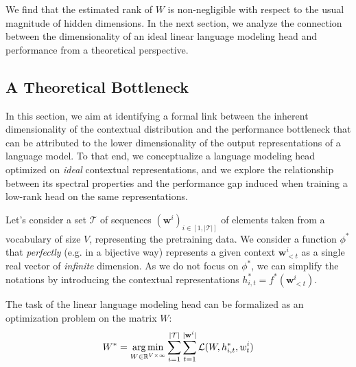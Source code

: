 We find that the estimated rank of $W$ is non-negligible with respect to the usual magnitude of hidden dimensions. In the next section, we analyze the connection between the dimensionality of an ideal linear language modeling head and performance from a theoretical perspective.


\subsection{A Theoretical Bottleneck}
In this section, we aim at identifying a formal link between the inherent dimensionality of the contextual distribution and the performance bottleneck that can be attributed to the lower dimensionality of the output representations of a language model. To that end, we conceptualize a language modeling head optimized on \textit{ideal} contextual representations, and we explore the relationship between its spectral properties and the performance gap induced when training a low-rank head on the same representations.  


Let's consider a set $\mathcal{T}$ of sequences $(\mathbf{w}^i)_{i \in [1, |\mathcal{T}|]}$ of elements taken from a vocabulary of size $V$, representing the pretraining data. We consider a function $\phi^*$ that \textit{perfectly} (e.g. in a bijective way) represents a given context $\mathbf{w}^i_{<t}$ as a single real vector of \textit{infinite} dimension. As we do not focus on $\phi^*$, we can simplify the notations by introducing the contextual representations $h^*_{i,t} = f^*(\mathbf{w}^i_{<t})$. 

The task of the linear language modeling head can be formalized as an optimization problem on the matrix $W$:
\begin{equation}
W^* = \operatorname*{arg\,min}_{W \in \mathbb{R}^{V \times \infty}} \sum_{i=1}^{|\mathcal{T}|} \sum_{t=1}^{|\mathbf{w}^i|} \mathcal{L}(W, h^*_{i,t}, w^i_t)
\label{eq:unconstrained}
\end{equation}


